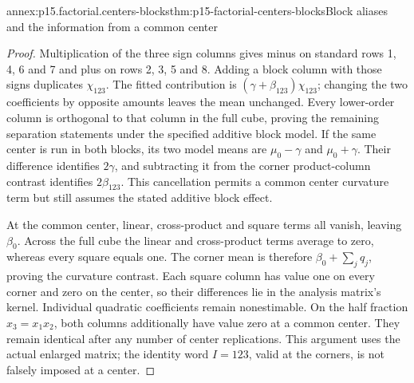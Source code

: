 \begin{annexitem}{annex:p15.factorial.centers-blocks}{thm:p15-factorial-centers-blocks}{Block aliases and the information from a common center}
\begin{proof}
Multiplication of the three sign columns gives minus on standard rows
1, 4, 6 and 7 and plus on rows 2, 3, 5 and 8. Adding a block column with
those signs duplicates \(\chi_{123}\). The fitted contribution is
\((\gamma+\beta_{123})\chi_{123}\); changing the two coefficients
by opposite amounts leaves the mean unchanged. Every lower-order column
is orthogonal to that column in the full cube, proving the remaining
separation statements under the specified additive block model.
If the same center is run in both blocks, its two model means are
\(\mu_0-\gamma\) and \(\mu_0+\gamma\). Their difference identifies
\(2\gamma\), and subtracting it from the corner product-column contrast
identifies \(2\beta_{123}\). This cancellation permits a common center
curvature term but still assumes the stated additive block effect.

At the common center, linear, cross-product and square terms all vanish,
leaving \(\beta_0\). Across the full cube the linear and cross-product
terms average to zero, whereas every square equals one. The corner mean
is therefore \(\beta_0+\sum_jq_j\), proving the curvature contrast.
Each square column has value one on every corner and zero on the center,
so their differences lie in the analysis matrix's kernel. Individual
quadratic coefficients remain nonestimable. On the half fraction
\(x_3=x_1x_2\), both columns additionally have value zero at a common
center. They remain identical after any number of center replications.
This argument uses the actual enlarged matrix; the identity word
\(I=123\), valid at the corners, is not falsely imposed at a center.
\end{proof}
\end{annexitem}

